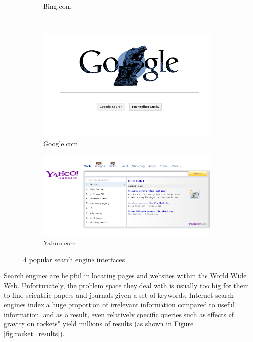 \documentclass[12pt,a4paper]{article}
\begin{document}
\begin{figure}[!ht]
\begin{subfigure}[b]{0.50\textwidth}
                \caption{Bing.com}
                \label{fig:bing_interface}
        \end{subfigure}\\
        \begin{subfigure}[b]{0.50\textwidth}
                \centering
                \includegraphics[width=\textwidth]{images/google_front.png}
                \caption{Google.com}
                \label{fig:google_interface}
        \end{subfigure}%
        \begin{subfigure}[b]{0.50\textwidth}
                \centering
                \includegraphics[width=\textwidth]{images/yahoo_front.png}
                \caption{Yahoo.com}
                \label{fig:yahoo_interface}
        \end{subfigure}%
        \caption{4 popular search engine interfaces}\label{fig:animals}
        \label{fig:search_interfaces}
\end{figure}


Search engines are helpful in locating pages and websites within the World Wide
Web. Unfortunately, the problem space they deal with is usually too big for
them to find scientific papers and journals given a set of keywords. Internet
search engines index a huge proportion of irrelevant information compared to
useful information\cite{Berghel1997}, and as a result, even relatively specific
queries such as effects of gravity on rockets" yield millions of results (as
shown in Figure \ref{fig:rocket_results}). 
\end{document}
